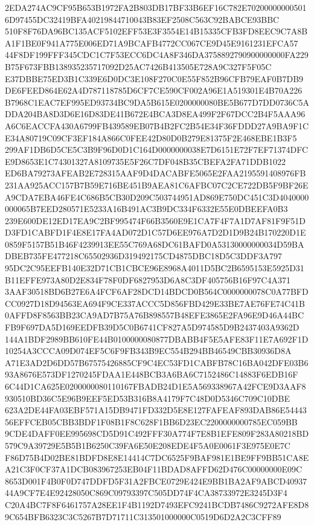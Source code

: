 \documentclass[UTF8,fontset=fandol,zihao=-4,a4paper]{ctexart}
\begin{document}
{{2EDA274AC9CF95B653B1972FA2B803DB17BF33B6EF16C782E702000000005016D97455DC32419BFA40219844710043B83EF2508C563C92BABCE93BBC
510F8F76DA96BC135ACF5102EFF53E3F3554E14B15335CFB3FD8EEC9C7A8BA1F1BE0F941A775E006ED71A9BCAFB4772CC067CE9D45E9161231EFCA57
44F8DF199FFF345CDC1C7F53ECC6DC4A8F346DA3758892790900000000FA229B75F673FBB138935235717092D25AC7426B413505E728A9C327F5F05C
E37DBBE75ED3B1C339E6D0DC3E108F270C0E55F852B96CFB79EAF0B7DB9DE6FEED864E62A4D787118785D6CF7CE590CF002A96E1A519301E4B70A226
B7968C1EAC7EF995ED93734BC9DA5B615E0200000080BE5B677D7DD0736C5ADDA204BA8D3D6E16D83DE41B672E4BCA3D8EA499F2F67DCC2B4F5AAA96
A6C6EACCFA430A6799FB439589EB07B4B2FC2B54E34F36FDDD27A9BA9F1CE34A80719C09CF3EF184A866C0FEE42D80D0B279E81375F2E468EBE1B3F5
299AF1DB6D5CE5C3B9F96D0D1C164D0000000038E7D6151E72F7EF71374DFCE9D8653E1C74301327A8109735E5F26C7DF048B35CBEFA2FA71DDB1022
ED6BA79273AFEAB2E728315AAF9D4DACABFE5065E2FAA2195591408976FB231AA925ACC157B7B59E716BE451B9AEA81C6AFBC07C2CE722DB5F9BF26E
A9CDA7EBA46FE4C686B5CB30D209C503744951AD869E750DC451C3D4040000000065B7EED280571E5233A16B491AC3B9DC334F6332E55E0DBEEFA0B3
239E600DE12ED17EA9C2BF995474F66B3560E9E1CA7F4F7A1D7AF81F9F51DD3FD1CABFD1F4E8E17FA4AD072D1C57D6EE976A7D2D1D9B24B170220D1E
0859F5157B51B46F4239913EE55C769A68DC61BAFD0A53130000000034D59BADBEB735FE477218C65502936D319492175CD4875DBC18D5C3DDF3A797
95DC2C95EEFB140E32D71CB1CBCE96E8968A4011D5BC2B6595153E5925D31B11EFFE973A80D2E834F78F0DF6827953D6A8C3DF405756B16F97C4A371
3AAF30518BD6B27E6A4FCF6AF28DCD14BDCD0B564C0000000078C0A77BFDCC0927D18D94563EA694F9CE337ACCC5D856FBD429E33BE7AE76FE74C41B
0AFFD8F8563BB23CA9AD7B75A76B898557B48EFE3865E2FA96E9D46A44BCFB9F697DA5D169EEDFB39D5C0B6741CF827A5D974585D9B2437403A9362D
144A1BDF2989BB610FE44B0100000080877DBABB4F5E5AFE83F11E7A692F1D10254A3CCCA09D074EF5C6F9FB343B9EC554B294BB46549CBB30936D8A
A71E3AD2D6DD57B67575426885CF9C4EC53FD1CABFB78C16BA042DFE03B693A8676E573DF1270245FDAA1E448BCB3A6BA6C7152486C14883F6EDB16F
6C44D1CA625E0200000080110167FBADB24D1E5A569338967A42FCE9D3AAF8930510BD36C5E96B9EEF5ED53B316B8A4179F7C48D0D5346C709C10DBE
623A2DE44FA03EBF571A15DB9471FD332D5E8E127FAFEAF893DAB86E5444356EFFCEB05CBB3BDF1F08B1F8C628F1BB6D23EC2200000000785EC059BB
9CDE4DAFF0EE995698CD5D91C492FFF30A774F7E8B1EFE809F283A80218BD579C9A39729E5B5B1B6250C39FA6E50E208EDE4F5A0E0061F3E975E0E7C
F86D75B4D02BE81BDFD8E8E14414C7DC6525F9BAF981E1BE9FF9BB51CA8EA21C3F0CF37A1DCB083967253EB04F11BDAD8AFFD62D476C00000000E09C
8653D001F4B0F0D747DDFD5F31A2FBCE0729E424E9BB1BA2AF9ABCD4093744A9CF7E4E92428050C869C09793397C505DD74F4CA38733972E3245D3F4
C20A4BC7F8F6461757A28EE1F4B1192D7493EFC9241BCDB7486C9272AFE8D89C654BFB6323C3C5267B7D71711C313501000000C0519D6D2A2C3CFF89
}}
\end{document}
